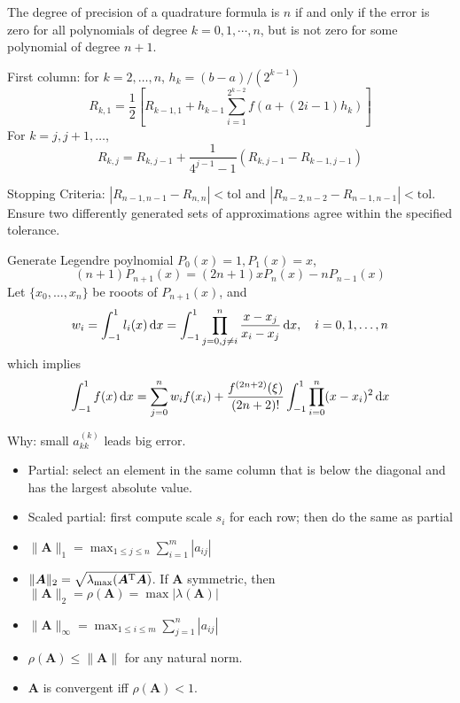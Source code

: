 \begin{definition}
The degree of precision of a quadrature formula is $n$ if and only if the error is zero for all polynomials of degree $k = 0,1,\cdots,n$, but is not zero for some polynomial of degree $n + 1.$
\end{definition}
\begin{definition}
First column: for $k=2,\dots,n$, $h_k=(b-a)/(2^{k-1})$
\[
R_{k,1}=\frac{1}{2}\left[
R_{k-1,1}+h_{k-1}\sum_{i=1}^{2^{k-2}}f(a+(2i-1)h_k)
\right]
\]
For $k=j,j+1,\dots$,
\[
R_{k,j}=R_{k,j-1}+\frac{1}{4^{j-1}-1}(R_{k,j-1}-R_{k-1,j-1})
\]
\end{definition}
Stopping Criteria: $|R_{n-1,n-1}-R_{n,n}|<\mbox{tol}$ and $|R_{n-2,n-2}-R_{n-1,n-1}|<\mbox{tol}$. Ensure two differently generated sets of approximations agree within the specified tolerance.
\begin{definition}
Generate Legendre poylnomial $P_0(x)=1,P_1(x)=x$,
\[
(n+1)P_{n+1}(x)=(2n+1)xP_n(x)-nP_{n-1}(x)
\]
Let $\{x_0,\dots,x_n\}$ be rooots of $P_{n+1}(x)$, and
\[
w_i=\int_{-1}^1l_i(x)\,\mathrm{d} x=\int_{-1}^1\prod_{j=0,j\ne i}^n\frac{x-x_j}{x_i-x_j}\,\mathrm{d} x,\quad i=0,1,\dots,n
\]
which implies
\[
\int_{-1}^1f(x)\,\mathrm{d} x=\sum_{j=0}^nw_if(x_i)+\frac{f^{(2n+2)}(\xi)}{(2n+2)!}\int_{-1}^1\prod_{i=0}^n(x-x_i)^2\,\mathrm{d} x
\]
\end{definition}
\begin{definition}[Pivoting]
Why: small $a_{kk}^{(k)}$ leads big error. 
\begin{itemize}
\item
Partial: select an element in the same column that is below the diagonal and has the largest absolute value.
\item
Scaled partial: first compute scale $s_i$ for each row; then do the same as partial
\end{itemize}
\end{definition}
\begin{proposition}
\begin{itemize}
\item
$\|\bm A\|_1=\max_{1\le j\le n}\sum_{i=1}^m|a_{ij}|$
\item
$\|\bm A\|_2=\sqrt{\lambda_{\max}(\bm A^{\mathrm T}\bm A)}$. If $\bm A$ symmetric, then $\|\bm A\|_2=\rho(\bm A)=\max|\lambda(\bm A)|$
\item
$\|\bm A\|_\infty=\max_{1\le i\le m}\sum_{j=1}^n|a_{ij}|$
\item
$\rho(\bm A)\le\|\bm A\|$ for any natural norm.
\item
$\bm A$ is convergent iff $\rho(\bm A)<1$.
\end{itemize}
\end{proposition}
